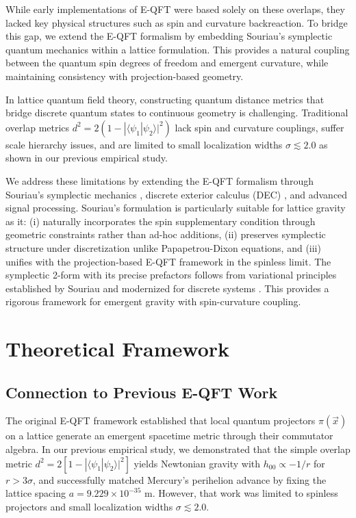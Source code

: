 \documentclass[prd,twocolumn,showpacs,superscriptaddress]{revtex4-2}
\begin{document}
	While early implementations of E-QFT were based solely on these overlaps, they lacked key physical structures such as spin and curvature backreaction. To bridge this gap, we extend the E-QFT formalism by embedding Souriau's symplectic quantum mechanics within a lattice formulation. This provides a natural coupling between the quantum spin degrees of freedom and emergent curvature, while maintaining consistency with projection-based geometry.
	
	In lattice quantum field theory, constructing quantum distance metrics that bridge discrete quantum states to continuous geometry is challenging. Traditional overlap metrics \(d^2 = 2(1-|\langle\psi_1|\psi_2\rangle|^2)\) lack spin and curvature couplings, suffer scale hierarchy issues, and are limited to small localization widths \(\sigma \lesssim 2.0\) as shown in our previous empirical study.
	
	We address these limitations by extending the E-QFT formalism through Souriau's symplectic mechanics \cite{Souriau1970}, discrete exterior calculus (DEC) \cite{Desbrun2005}, and advanced signal processing. Souriau's formulation is particularly suitable for lattice gravity as it: (i) naturally incorporates the spin supplementary condition through geometric constraints rather than ad-hoc additions, (ii) preserves symplectic structure under discretization unlike Papapetrou-Dixon equations, and (iii) unifies with the projection-based E-QFT framework in the spinless limit. The symplectic 2-form with its precise prefactors follows from variational principles established by Souriau and modernized for discrete systems \cite{Leok2019}. This provides a rigorous framework for emergent gravity with spin-curvature coupling.
	
	\section{Theoretical Framework}
	
	\subsection{Connection to Previous E-QFT Work}
	
	The original E-QFT framework established that local quantum projectors $\pi(\vec{x})$ on a lattice generate an emergent spacetime metric through their commutator algebra. In our previous empirical study, we demonstrated that the simple overlap metric $d^2 = 2[1 - |\langle\psi_1|\psi_2\rangle|^2]$ yields Newtonian gravity with $h_{00} \propto -1/r$ for $r > 3\sigma$, and successfully matched Mercury's perihelion advance by fixing the lattice spacing $a = 9.229 \times 10^{-35}$ m. However, that work was limited to spinless projectors and small localization widths $\sigma \lesssim 2.0$.
	
\end{document}
